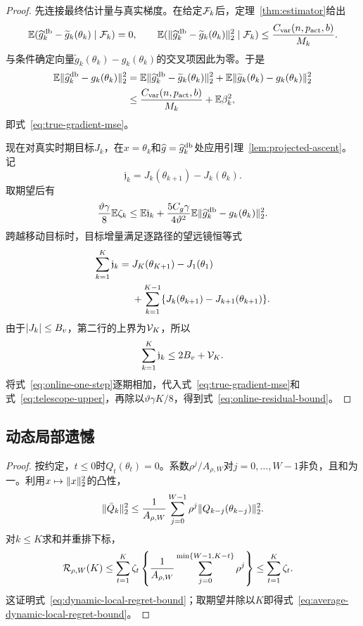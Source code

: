\begin{proof}
先连接最终估计量与真实梯度。在给定$\mathcal F_k$后，定理~\ref{thm:estimator}给出
\[
 \mathbb E(\widehat g_k^{\mathrm{db}}-\widetilde g_k(\theta_k)\mid\mathcal F_k)=0,
 \qquad
 \mathbb E(\lVert\widehat g_k^{\mathrm{db}}-\widetilde g_k(\theta_k)\rVert_2^2\mid\mathcal F_k)
 \le\frac{C_{\rm var}(n,p_{\rm act},b)}{M_k}.
\]
与条件确定向量$\widetilde g_k(\theta_k)-g_k(\theta_k)$的交叉项因此为零。于是
\begin{align*}
 \mathbb E\lVert\widehat g_k^{\mathrm{db}}-g_k(\theta_k)\rVert_2^2
 &=\mathbb E\lVert\widehat g_k^{\mathrm{db}}-\widetilde g_k(\theta_k)\rVert_2^2
 +\mathbb E\lVert\widetilde g_k(\theta_k)-g_k(\theta_k)\rVert_2^2\\
 &\le\frac{C_{\rm var}(n,p_{\rm act},b)}{M_k}+\mathbb E\beta_k^2,
\end{align*}
即式~\eqref{eq:true-gradient-mse}。

现在对真实时期目标$J_k$，在$x=\theta_k$和$\widehat g=\widehat g_k^{\mathrm{db}}$处应用引理~\ref{lem:projected-ascent}。记
\[
 \mathfrak j_k=J_k(\theta_{k+1})-J_k(\theta_k).
\]
取期望后有
\begin{equation}\label{eq:online-one-step}
 \frac{\vartheta\gamma}{8}\mathbb E\zeta_k
 \le\mathbb E \mathfrak j_k
 +\frac{5C_g\gamma}{4\vartheta^2}
 \mathbb E\lVert\widehat g_k^{\mathrm{db}}-g_k(\theta_k)\rVert_2^2.
\end{equation}
跨越移动目标时，目标增量满足逐路径的望远镜恒等式
\begin{align}\label{eq:moving-objective-telescope}
 \sum_{k=1}^{K}\mathfrak j_k
 ={}&J_K(\theta_{K+1})-J_1(\theta_1)\notag\\
 &+\sum_{k=1}^{K-1}
 \{J_k(\theta_{k+1})-J_{k+1}(\theta_{k+1})\}.
\end{align}
由于$\lvert J_k\rvert\le B_v$，第二行的上界为$\mathcal V_K$，所以
\begin{equation}\label{eq:telescope-upper}
 \sum_{k=1}^{K}\mathfrak j_k\le2B_v+\mathcal V_K.
\end{equation}
将式~\eqref{eq:online-one-step}逐期相加，代入式~\eqref{eq:true-gradient-mse}和式~\eqref{eq:telescope-upper}，再除以$\vartheta\gamma K/8$，得到式~\eqref{eq:online-residual-bound}。
\end{proof}

\subsection{动态局部遗憾}

\begin{proof}
按约定，$t\le0$时$Q_t(\theta_t)=0$。系数$\rho^j/A_{\rho,W}$对$j=0,\ldots,W-1$非负，且和为一。利用$x\mapsto\lVert x\rVert_2^2$的凸性，
\[
 \lVert\bar Q_k\rVert_2^2
 \le \frac{1}{A_{\rho,W}}\sum_{j=0}^{W-1}\rho^j
       \lVert Q_{k-j}(\theta_{k-j})\rVert_2^2.
\]
对$k\le K$求和并重排下标，
\begin{align*}
 \mathcal R_{\rho,W}(K)
 &\le
 \sum_{t=1}^{K}\zeta_t
 \left\{\frac{1}{A_{\rho,W}}\sum_{j=0}^{\min\{W-1,K-t\}}\rho^j\right\}
 \le \sum_{t=1}^{K}\zeta_t.
\end{align*}
这证明式~\eqref{eq:dynamic-local-regret-bound}；取期望并除以$K$即得式~\eqref{eq:average-dynamic-local-regret-bound}。
\end{proof}

